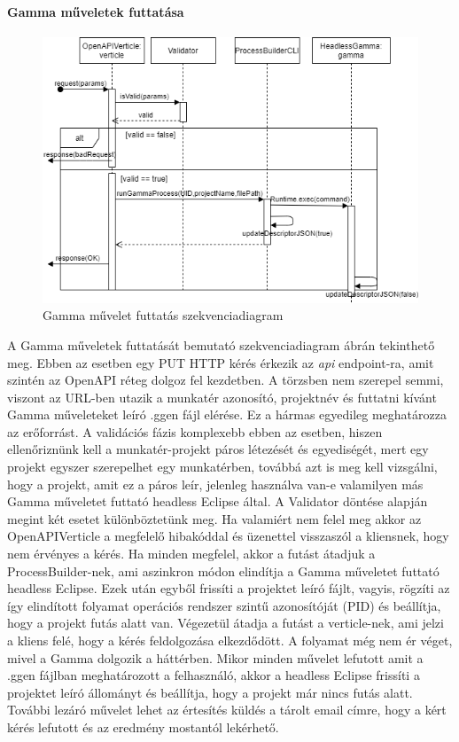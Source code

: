 \paragraph{Gamma műveletek futtatása}
\begin{figure}[!ht]
	\includegraphics[width=150mm, keepaspectratio]{figures/run_gamma_seq.png}
	\caption{Gamma művelet futtatás szekvenciadiagram}
	\label{fig:rungamma}
\end{figure}
A Gamma műveletek futtatását bemutató szekvenciadiagram  ábrán tekinthető meg. Ebben az esetben egy PUT HTTP kérés érkezik az \textit{api} endpoint-ra, amit szintén az OpenAPI réteg dolgoz fel kezdetben. A törzsben nem szerepel semmi, viszont az URL-ben utazik a munkatér azonosító, projektnév és futtatni kívánt Gamma műveleteket leíró .ggen fájl elérése. Ez a hármas egyedileg meghatározza az erőforrást. A validációs fázis komplexebb ebben az esetben, hiszen ellenőriznünk kell a munkatér-projekt páros létezését és egyediségét, mert egy projekt egyszer szerepelhet egy munkatérben, továbbá azt is meg kell vizsgálni, hogy a projekt, amit ez a páros leír, jelenleg használva van-e valamilyen más Gamma műveletet futtató headless Eclipse által. A Validator döntése alapján megint két esetet különböztetünk meg. Ha valamiért nem felel meg akkor az OpenAPIVerticle a megfelelő hibakóddal és üzenettel visszaszól a kliensnek, hogy nem érvényes a kérés. Ha minden megfelel, akkor a futást átadjuk a ProcessBuilder-nek, ami aszinkron módon elindítja a Gamma műveletet futtató headless Eclipse. Ezek után egyből frissíti a projektet leíró fájlt, vagyis, rögzíti az így elindított folyamat operációs rendszer szintű azonosítóját (PID) és beállítja, hogy a projekt futás alatt van. Végezetül átadja a futást a verticle-nek, ami jelzi a kliens felé, hogy a kérés feldolgozása elkezdődött.
A folyamat még nem ér véget, mivel a Gamma dolgozik a háttérben. Mikor minden művelet lefutott amit a .ggen fájlban meghatározott a felhasználó, akkor a headless Eclipse frissíti a projektet leíró állományt és beállítja, hogy a projekt már nincs futás alatt. További lezáró művelet lehet az értesítés küldés a tárolt email címre, hogy a kért kérés lefutott és az eredmény mostantól lekérhető.


